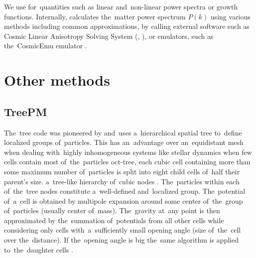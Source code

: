 We use  for~quantities such as linear and~non-linear power spectra or growth functions. Internally,  calculates the~matter power spectrum  $P(k)$ using various methods including common approximations, by calling external software such as Cosmic Linear Anisotropy Solving System (, \textcite{class}), or emulators, such as the~CosmicEmu emulator \parencite{Heitmann:2015xma}.

\section{Other methods}
\subsection{TreePM}
The~tree code was pioneered by \textcite{1986Natur.324..446B} and~uses a~hierarchical spatial tree to~define localized groups of~particles. This has an~advantage over an~equidistant mesh when dealing with~highly inhomogeneous systems like stellar dynamics when few cells \DIFdelbegin {}\DIFdelend \DIFaddbegin {}\DIFaddend contain most of~the~particles \DIFdelbegin {}\DIFdelend \DIFaddbegin {}\DIFaddend oct-tree, each cubic cell containing more than some maximum number of~particles is split into eight child cells of~half their parent's size. \DIFdelbegin {}\DIFdelend \DIFaddbegin {}\DIFaddend a~tree-like hierarchy of~cubic nodes \DIFdelbegin {}\DIFdelend \DIFaddbegin {}\DIFaddend . The~particles within each of~the~tree nodes constitute a~well-defined and~localized group. The~potential of~a~cell is obtained by multipole expansion around some center of~the~group of~particles (usually center of~mass). The~gravity at~any point is then approximated by the~summation of~potentials from all other cells while considering only cells with~a~sufficiently small opening angle (size of~the~cell over the~distance). If the~opening angle is big the~same algorithm is applied to~the~daughter cells \DIFaddbegin \parencite{2011EPJP..126...55D}\DIFaddend .

